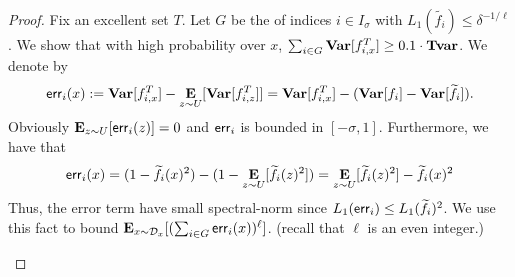 \begin{proof}
Fix an excellent set $T$. Let $G$ be the of indices $i\in I_{\sigma}$ with $L_1(\tilde{f_i})\le \delta^{-1/\ell}$. We show that with high probability over $x$, $\sum_{i\in G}{{\mathop{\bf Var\/}}[f^T_{i,x}]} \ge 0.1 \cdot \mathbf{{Tvar}}$. We denote by 
$${\mathsf{err}}_i(x) := {\mathop{\bf Var\/}}[f^T_{i,x}] - \mathop{\bf E\/}_{z \sim U}[{\mathop{\bf Var\/}}[f^T_{i,z}]] = {\mathop{\bf Var\/}}[f^T_{i,x}] - ({\mathop{\bf Var\/}}[f_i] - {\mathop{\bf Var\/}}[\widetilde{f_i}]).$$
Obviously $\mathop{\bf E\/}_{z\sim U}[{\mathsf{err}}_i(z)] = 0$ and ${\mathsf{err}}_i$ is bounded in $[-\sigma,1]$.
Furthermore, we have that $${\mathsf{err}}_i(x) = (1-\widetilde{f_i}(x)^2) -(1 - \mathop{\bf E\/}_{z\sim U}[\widetilde{f_i}(z)^2]) = \mathop{\bf E\/}_{z\sim U}[\widetilde{f_i}(z)^2] - \widetilde{f_i}(x)^2$$
Thus, the error term have small spectral-norm since $L_1({\mathsf{err}}_i) \le L_1(\widetilde{f_i})^2$. We use this fact to bound 
$\mathop{\bf E\/}_{x\sim {\mathcal{D}_x}}[ (\sum_{i\in G} {\mathsf{err}}_i(x))^{\ell}]$. (recall that $\ell$ is an even integer.)
%
%
\begin{claim}\label{claim:small l-moment err}

\end{claim}
\end{proof}
